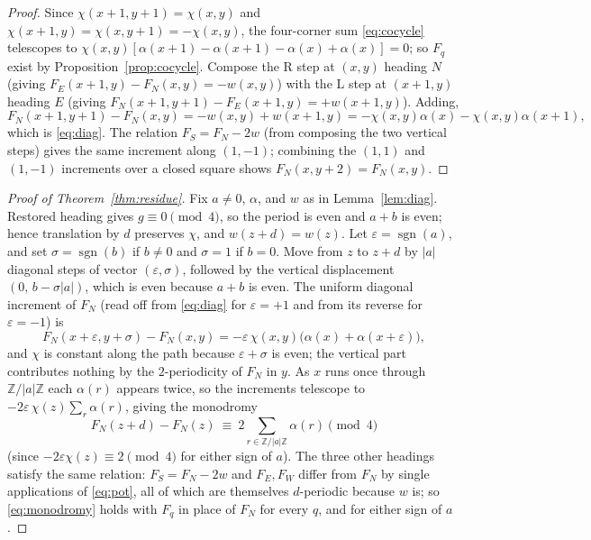 \documentclass[11pt,letterpaper]{article}
\theoremstyle{plain}
\theoremstyle{definition}
\newcommand{\Z}{\mathbb{Z}}
\newcommand{\che}{\chi}
\newcommand{\drift}{d}
\newcommand{\growth}{g}
\newcommand{\turnR}{\mathrm{R}}
\newcommand{\turnL}{\mathrm{L}}
\begin{document}
\begin{NoHyper}
\begin{proof}
Since $\che(x{+}1,y{+}1)=\che(x,y)$ and $\che(x{+}1,y)=\che(x,y{+}1)=-\che(x,y)$, the
four-corner sum \eqref{eq:cocycle} telescopes to
$\che(x,y)[\alpha(x{+}1)-\alpha(x{+}1)-\alpha(x)+\alpha(x)]=0$;
so $F_q$ exist by Proposition~\ref{prop:cocycle}. Compose the $\turnR$ step at $(x,y)$ heading $N$ (giving
$F_E(x{+}1,y)-F_N(x,y)=-w(x,y)$) with the $\turnL$ step at $(x{+}1,y)$ heading $E$
(giving $F_N(x{+}1,y{+}1)-F_E(x{+}1,y)=+w(x{+}1,y)$). Adding,
\[
F_N(x{+}1,y{+}1)-F_N(x,y)=-w(x,y)+w(x{+}1,y)=-\che(x,y)\alpha(x)-\che(x,y)\alpha(x{+}1),
\]
which is \eqref{eq:diag}. The relation $F_S=F_N-2w$ (from composing the two vertical
steps) gives the same increment along $(1,-1)$; combining the $(1,1)$ and $(1,-1)$
increments over a closed square shows $F_N(x,y{+}2)=F_N(x,y)$.
\end{proof}

\begin{proof}[Proof of Theorem~\ref{thm:residue}]
Fix $a\neq0$, $\alpha$, and $w$ as in Lemma~\ref{lem:diag}. Restored heading gives
$\growth\equiv0\pmod4$, so the period is even and $a+b$ is even; hence translation by
$\drift$ preserves $\che$, and $w(z+\drift)=w(z)$. Let $\varepsilon=\operatorname{sgn}(a)$,
and set $\sigma=\operatorname{sgn}(b)$ if $b\neq0$ and $\sigma=1$ if $b=0$. Move from
$z$ to $z+\drift$ by $|a|$ diagonal steps of vector $(\varepsilon,\sigma)$, followed by
the vertical displacement $(0,\,b-\sigma|a|)$, which is even because $a+b$ is even. The
uniform diagonal increment of $F_N$ (read off from \eqref{eq:diag} for
$\varepsilon=+1$ and from its reverse for $\varepsilon=-1$) is
\begin{equation}\label{eq:uniform}
F_N(x+\varepsilon,y+\sigma)-F_N(x,y)=-\varepsilon\,\che(x,y)\bigl(\alpha(x)+\alpha(x+\varepsilon)\bigr),
\end{equation}
and $\che$ is constant along the path because $\varepsilon+\sigma$ is even; the
vertical part contributes nothing by the $2$-periodicity of $F_N$ in $y$. As $x$ runs
once through $\Z/|a|\Z$ each $\alpha(r)$ appears twice, so the increments telescope to
$-2\varepsilon\,\che(z)\sum_{r}\alpha(r)$, giving the monodromy
\begin{equation}\label{eq:monodromy}
F_N(z+\drift)-F_N(z)\ \equiv\ 2\sum_{r\in\Z/|a|\Z}\alpha(r)\pmod4
\end{equation}
(since $-2\varepsilon\che(z)\equiv2\pmod4$ for either sign of $a$). The three other headings satisfy the same relation: $F_S=F_N-2w$
and $F_E,F_W$ differ from $F_N$ by single applications of \eqref{eq:pot}, all of which
are themselves $\drift$-periodic because $w$ is; so \eqref{eq:monodromy} holds with
$F_q$ in place of $F_N$ for every $q$, and for either sign of $a$.


\end{proof}
\end{NoHyper}
\end{document}
